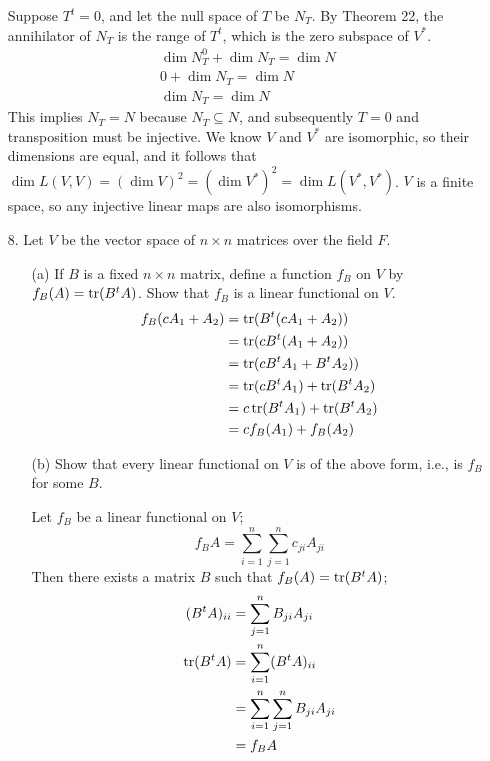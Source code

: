\documentclass{article}
\begin{document}
\begin{enumerate}[listparindent=\parindent]
    Suppose \(T^t = 0\), and let the null space of \(T\) be \(N_T\).
    By Theorem 22, the annihilator of \(N_T\) is the range of \(T^t\), which is the zero subspace of \(V^*\).
    \begin{gather*}
        \dim N_T^0 + \dim N_T = \dim N \\
        0 + \dim N_T = \dim N \\
        \dim N_T = \dim N
    \end{gather*}
    This implies \(N_T = N\) because \(N_T \subseteq N\), and subsequently \(T = 0\) and transposition must be injective.
    We know \(V\) and \(V^*\) are isomorphic, so their dimensions are equal, and it follows that
    \(\dim L(V, V) = (\dim V)^2 = (\dim V^*)^2 = \dim L(V^*, V^*)\).
    \(V\) is a finite space, so any injective linear maps are also isomorphisms.

\item[8.] Let \(V\) be the vector space of \(n \times n\) matrices over the field \(F\).
\begin{enumerate}[listparindent=\parindent]
\item[(a)] If \(B\) is a fixed \(n \times n\) matrix, define a function \(f_B\) on \(V\) by \(f_B(A) = \operatorname{tr}(B^tA)\).
    Show that \(f_B\) is a linear functional on \(V\).
    \begin{align*}
        f_B(cA_1 + A_2) &= \operatorname{tr}(B^t(cA_1 + A_2)) \\
                        &= \operatorname{tr}(cB^t(A_1 + A_2)) \\
                        &= \operatorname{tr}(cB^tA_1 + B^tA_2)) \\
                        &= \operatorname{tr}(cB^tA_1) + \operatorname{tr}(B^tA_2) \\
                        &= c\operatorname{tr}(B^tA_1) + \operatorname{tr}(B^tA_2) \\
                        &= cf_B(A_1) + f_B(A_2)
    \end{align*}

\item[(b)] Show that every linear functional on \(V\) is of the above form, i.e., is \(f_B\) for some \(B\).

    Let \(f_B\) be a linear functional on \(V\);
    \[f_BA = \sum_{i=1}^{n} \sum_{j=1}^{n} c_{ji}A_{ji}\]
    Then there exists a matrix \(B\) such that \(f_B(A) = \operatorname{tr}(B^tA)\);
    \begin{align*}
        (B^tA)_{ii} &= \sum_{j=1}^{n} B_{ji}A_{ji} \\
        \operatorname{tr}(B^tA) &= \sum_{i=1}^{n} (B^tA)_{ii} \\
                  &= \sum_{i=1}^{n} \sum_{j=1}^{n} B_{ji}A_{ji} \\
                  &= f_BA
    \end{align*}


\end{enumerate}
\end{enumerate}
\end{document}

